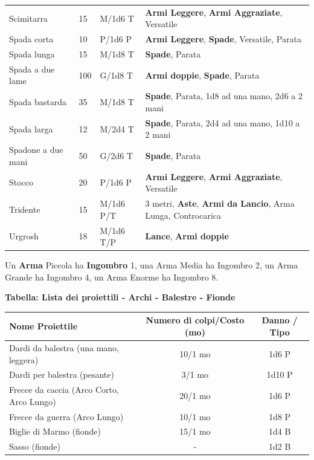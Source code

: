 \begin{xltabular}{\linewidth}{lllX}
Scimitarra& 15 & M/1d6 T&\textbf{Armi Leggere}, \textbf{Armi Aggraziate}, Versatile\\
Spada corta& 10 & P/1d6 P&\textbf{Armi Leggere}, \textbf{Spade}, Versatile, Parata\\
Spada lunga& 15 & M/1d8 T&\textbf{Spade}, Parata\\
Spada a due lame& 100& G/1d8 T& \textbf{Armi doppie}, \textbf{Spade}, Parata\\
Spada bastarda& 35 & M/1d8 T&\textbf{Spade}, Parata, 1d8 ad una mano, 2d6 a 2 mani\\
Spada larga& 12 & M/2d4 T&\textbf{Spade}, Parata, 2d4 ad una mano, 1d10 a 2 mani\\
Spadone a due mani& 50 & G/2d6 T&\textbf{Spade}, Parata\\
Stocco& 20 & P/1d6 P& \textbf{Armi Leggere}, \textbf{Armi Aggraziate}, Versatile\\
Tridente& 15 & M/1d6 P/T& 3 metri, \textbf{Aste}, \textbf{Armi da Lancio}, Arma Lunga, Controcarica\\
Urgrosh& 18 & M/1d6 T/P& \textbf{Lance}, \textbf{Armi doppie}\\
\end{xltabular}

\medskip

Un \textbf{Arma} Piccola ha \textbf{Ingombro} 1, una Arma Media ha Ingombro 2, un Arma Grande ha Ingombro 4, un Arma Enorme ha Ingombro 8.

\medskip

\textbf{Tabella: Lista dei proiettili - Archi - Balestre - Fionde}\label{proiettili}

\noindent\begin{tabularx}{1\linewidth}{Xcc}
	\toprule
\rowcolor{gray!20}\textbf{Nome Proiettile}& \textbf{Numero di colpi/Costo (mo)} & \textbf{Danno / Tipo}\\
\toprule
Dardi da balestra (una mano, leggera) & 10/1 mo & 1d6 P\\
\rowcolor{gray!20}Dardi per balestra (pesante) & 3/1 mo & 1d10 P\\
Frecce da caccia (Arco Corto, Arco Lungo)& 20/1 mo & 1d6 P\\
\rowcolor{gray!20}Frecce da guerra (Arco Lungo)& 10/1 mo & 1d8 P\\
Biglie di Marmo (fionde)& 15/1 mo & 1d4 B\\
\rowcolor{gray!20}Sasso (fionde)& -& 1d2 B
\end{tabularx}

